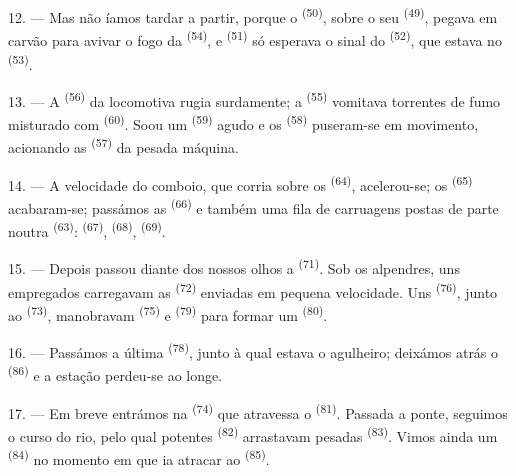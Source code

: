 12. --- Mas não íamos tardar a partir, porque o 
\textsuperscript{(50)}, sobre o seu  \textsuperscript{(49)}, pegava em
carvão para avivar o fogo da  \textsuperscript{(54)}, e  \textsuperscript{(51)} só esperava o sinal do  \textsuperscript{(52)}, que estava no  \textsuperscript{(53)}.

13. --- A  \textsuperscript{(56)} da locomotiva rugia surdamente; a
 \textsuperscript{(55)} vomitava torrentes de fumo misturado com
 \textsuperscript{(60)}. Soou um  \textsuperscript{(59)} agudo e
os  \textsuperscript{(58)} puseram-se em movimento, acionando as
 \textsuperscript{(57)} da pesada máquina.

\VUsaut{3.0mm}
\VUsaut{3.0mm}

14. --- A velocidade do comboio, que corria sobre os 
\textsuperscript{(64)}, acelerou-se; os  \textsuperscript{(65)} acabaram-se;
passámos as  \textsuperscript{(66)} e também uma fila de carruagens
postas de parte noutra  \textsuperscript{(63)}: 
\textsuperscript{(67)},  \textsuperscript{(68)},
 \textsuperscript{(69)}.


15. --- Depois passou diante dos nossos olhos a  \textsuperscript{(71)}. Sob os alpendres, uns empregados carregavam
as  \textsuperscript{(72)} enviadas em pequena velocidade. Uns
 \textsuperscript{(76)}, junto ao  \textsuperscript{(73)}, manobravam  \textsuperscript{(75)} e
 \textsuperscript{(79)} para formar um  \textsuperscript{(80)}.

16. --- Passámos a última  \textsuperscript{(78)}, junto à qual
estava o agulheiro; deixámos atrás o 
\textsuperscript{(86)} e a estação perdeu-se ao longe.

17. --- Em breve entrámos na  \textsuperscript{(74)} que
atravessa o  \textsuperscript{(81)}. Passada a ponte, seguimos o curso
do rio, pelo qual potentes  \textsuperscript{(82)} arrastavam
pesadas  \textsuperscript{(83)}. Vimos ainda um  \textsuperscript{(84)} no momento em que ia atracar ao
 \textsuperscript{(85)}.

